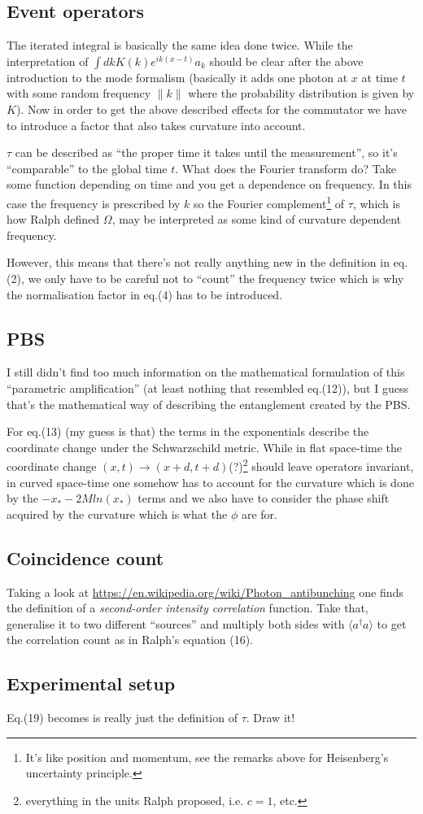 \documentclass[11pt]{report}
\begin{document}
\subsection{Event operators}
The iterated integral is basically the same idea done twice. While the interpretation of $\int dk K(k) e^{ik(x-t)}a_k$ should be clear after the above introduction to the mode formalism (basically it adds one photon at $x$ at time $t$ with some random frequency $\|k\|$ where the probability distribution is given by $K$). Now in order to get the above described effects for the commutator we have to introduce a factor that also takes curvature into account.

$\tau$ can be described as ``the proper time it takes until the measurement'', so it's ``comparable'' to the global time $t$. What does the Fourier transform do? Take some function depending on time and you get a dependence on frequency. In this case the frequency is prescribed by $k$ so the Fourier complement\footnote{It's like position and momentum, see the remarks above for Heisenberg's uncertainty principle.} of $\tau$, which is how Ralph defined $\Omega$, may be interpreted as some kind of curvature dependent frequency.

However, this means that there's not really anything new in the definition in eq.(2), we only have to be careful not to ``count'' the frequency twice which is why the normalisation factor in eq.(4) has to be introduced.

\subsection{PBS}
I still didn't find too much information on the mathematical formulation of this ``parametric amplification'' (at least nothing that resembled eq.(12)), but I guess that's the mathematical way of describing the entanglement created by the PBS.

For eq.(13) (my guess is that) the terms in the exponentials describe the coordinate change under the Schwarzschild metric. While in flat space-time the coordinate change $(x,t)\rightarrow (x+d,t+d)$(?)\footnote{everything in the units Ralph proposed, i.e. $c=1$, etc.} should leave operators invariant, in curved space-time one somehow has to account for the curvature which is done by the $-x_*-2Mln(x_*)$ terms and we also have to consider the phase shift acquired by the curvature which is what the $\phi$ are for.

\subsection{Coincidence count}
Taking a look at \url{https://en.wikipedia.org/wiki/Photon_antibunching} one finds the definition of a \textit{second-order intensity correlation} function. Take that, generalise it to two different ``sources'' and multiply both sides with $\langle a^\dagger a\rangle$ to get the correlation count as in Ralph's equation (16).

\subsection{Experimental setup}
Eq.(19) becomes is really just the definition of $\tau$. Draw it!
\end{document}
